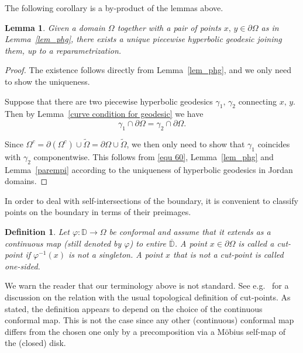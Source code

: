 \documentclass[reqno,11pt]{amsart}
\makeatletter
\def\wz{\widetilde}
\newtheorem{lem}[thm]{Lemma}%
\newtheorem{defn}[thm]{Definition}%
\numberwithin{equation}{section}
\theoremstyle{remark}
\makeatother
\begin{document}
The following corollary is a by-product of the lemmas above. 
\begin{lem}\label{unique}
Given a domain $\Omega$ together with a pair of points $x,\,y\in \partial \Omega$ as in Lemma~\ref{lem_phg}, there exists a unique piecewise hyperbolic geodesic joining them, up to a reparametrization. 
\end{lem}
\begin{proof}
The existence follows directly from Lemma~\ref{lem_phg}, and we only need to show the uniqueness.

Suppose that there are two piecewise hyperbolic geodesics $\gamma_1,\,\gamma_2$ connecting $x,\,y$. Then by Lemma~\ref{curve condition for geodesic} we have
\begin{equation}\label{equ 60}
\gamma_1\cap \partial \Omega=\gamma_2\cap \partial \Omega. 
\end{equation}

Since $\Omega^c=\partial(\Omega^c)\cup \wz \Omega=\partial \Omega \cup \wz \Omega$, we then only need to show that $\gamma_1$ coincides with $\gamma_2$ componentwise. This follows from \eqref{equ 60}, Lemma~\ref{lem_phg} and Lemma~\ref{parempi} according to the uniqueness of hyperbolic geodesics in   Jordan domains. 
\end{proof}

In order to deal with self-intersections of the boundary, it is convenient
to classify points on the boundary in terms of their preimages.


\begin{defn}
 Let $\varphi  \colon \mathbb{D} \to \Omega$ be conformal and assume that it
extends 
as a continuous map (still denoted by $\varphi$)
 to entire $\overline{\mathbb{D}}$. 
 A point $x \in \partial \Omega$ is called 
a \emph{cut-point} if $\varphi^{-1}(x)$ is not a singleton. 
A point $x$ that is not a cut-point is called \emph{one-sided}.
\end{defn}


We warn the reader that our terminology above is not standard. See e.g.\  \cite[Chapter 14]{R1974}
for a discussion on the relation with the usual topological definition of 
cut-points. As stated, the definition appears to depend on the choice of the
continuous conformal map. This is not the case since any other (continuous)
conformal map differs from the chosen one only by a precomposition via a 
M\"obius 
self-map of the (closed) disk.
\end{document}
